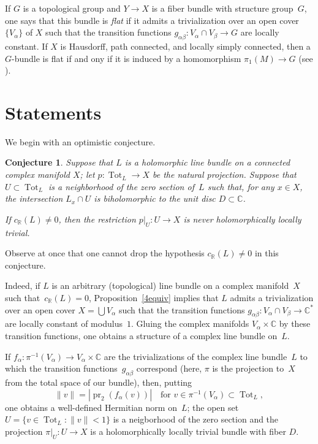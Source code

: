 \documentclass[11pt]{amsart}
\newcommand*{\C}{{\mathbb C}}
\newcommand*{\R}{{\mathbb R}}
\DeclareMathOperator{\pr}{pr}
\DeclareMathOperator{\Tot}{Tot}
\newtheorem{conj}[proposition]{Conjecture}
\theoremstyle{remark}
\theoremstyle{definition}
\begin{document}
If $G$ is a topological group and $Y\to X$ is a fiber bundle with
structure group~$G$, one says that this bundle is \emph{flat} if it
admits a trivialization over an open cover~$\{V_\alpha\}$ of $X$ such
that the transition functions $g_{\alpha\beta}\colon V_\alpha\cap
V_\beta\to G$ are locally constant.  If $X$ is Hausdorff, path
connected, and locally simply connected, then a $G$-bundle is flat if
and ony if it is induced by a homomorphism $\pi_1(M)\to G$ (see
\cite[\S\,13]{Steenrod}). 

\section{Statements}\label{sec:statements}

We begin with an optimistic conjecture.

\begin{conj}\label{conj}
Suppose that $L$ is a holomorphic line bundle on a connected complex
manifold $X$; let $p\colon\Tot_L\to X$ be the natural projection.
Suppose that $U\subset \Tot_L$ is a neighborhood of the zero section of~$L$
such that, for any $x\in X$, the intersection $L_x\cap U$
is biholomorphic to the unit disc $D\subset\C$.

If $c_\R(L)\ne 0$, then the restriction
$p|_U\colon U\to X$ is never holomorphically locally trivial.
\end{conj}

Observe at once that one cannot drop the hypothesis $c_\R(L)\ne0$ in
this conjecture. 

Indeed, if $L$ is an arbitrary (topological) line bundle on a complex
manifold~$X$ such that~$c_\R(L)=0$, Proposition~\ref{4equiv} implies
that $L$ admits a trivialization over an open cover $X=\bigcup
V_\alpha$ such that the transition functions $g_{\alpha\beta}\colon
V_\alpha\cap V_\beta\to\C^*$ are locally constant of
modulus~$1$. Gluing the complex manifolds $V_\alpha\times \C$ by these
transition functions, one obtains a structure of a complex line bundle
on~$L$.

If $f_\alpha\colon \pi^{-1}(V_\alpha)\to V_\alpha\times\C$ are the
trivializations of the complex line bundle~$L$ to which the transition
functions~$g_{\alpha\beta}$ correspond (here, $\pi$ is the projection
to~$X$ from the total space of our bundle), then, putting
\begin{equation}\label{eq:tubular}
\|v\|=|\pr_2(f_\alpha(v))|\quad \text{for
  $v\in\pi^{-1}(V_\alpha)\subset \Tot_L$},
\end{equation}
one obtains a well-defined Hermitian norm on~$L$; the open set
$U=\{v\in \Tot_L\colon \|v\|<1\}$ is a neigborhood of the zero section
and the projection $\pi|_U\colon U\to X$ is a holomorphically locally
trivial bundle with fiber $D$.
\end{document}
